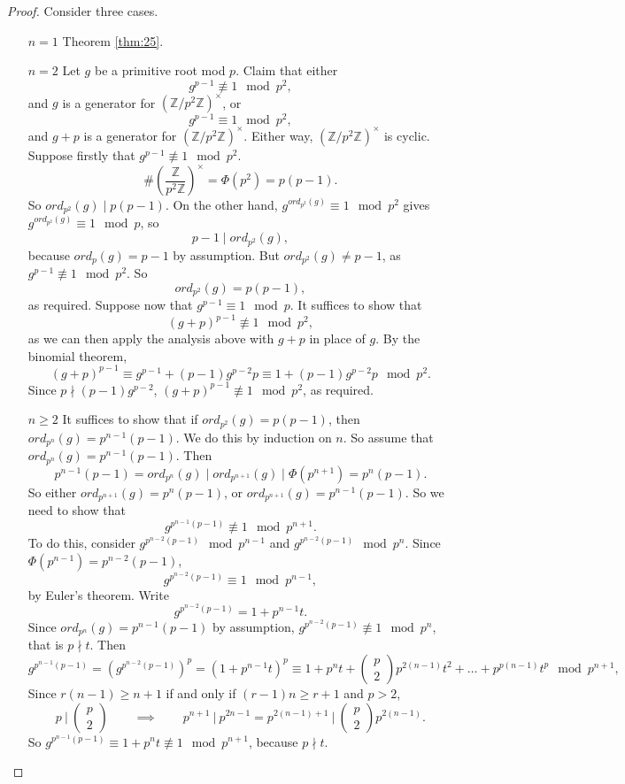 \documentclass{article}
\newcommand{\Z}{\mathbb{Z}}
\newcommand{\rb}[1]{\left( #1 \right)}
\newcommand{\two}[2]{\begin{pmatrix} #1 \\ #2 \end{pmatrix}}
\newcommand{\Unit}[1]{\rb{\dfrac{\Z}{#1\Z}}^\times}
\newcommand{\unit}[1]{\rb{\Z / #1\Z}^\times}
\theoremstyle{definition}\newtheorem{definition}{Definition}
\theoremstyle{definition}\newtheorem{remark}[definition]{Remark}
\theoremstyle{definition}\newtheorem*{example}{Example}
\theoremstyle{definition}\newtheorem*{note}{Note}
\begin{document}
\begin{proof}
Consider three cases.
\begin{itemize}[leftmargin=0.5in]
\item[$ n = 1 $] Theorem \ref{thm:25}.
\item[$ n = 2 $] Let $ g $ be a primitive root mod $ p $. Claim that either
$$ g^{p - 1} \not\equiv 1 \mod p^2, $$
and $ g $ is a generator for $ \unit{p^2} $, or
$$ g^{p - 1} \equiv 1 \mod p^2, $$
and $ g + p $ is a generator for $ \unit{p^2} $. Either way, $ \unit{p^2} $ is cyclic. Suppose firstly that $ g^{p - 1} \not\equiv 1 \mod p^2 $.
$$ \#\Unit{p^2} = \Phi\rb{p^2} = p\rb{p - 1}. $$
So $ ord_{p^2}\rb{g} \mid p\rb{p - 1} $. On the other hand, $ g^{ord_{p^2}\rb{g}} \equiv 1 \mod p^2 $ gives $ g^{ord_{p^2}\rb{g}} \equiv 1 \mod p $, so
$$ p - 1 \mid ord_{p^2}\rb{g}, $$
because $ ord_p\rb{g} = p - 1 $ by assumption. But $ ord_{p^2}\rb{g} \ne p - 1 $, as $ g^{p - 1} \not\equiv 1 \mod p^2 $. So
$$ ord_{p^2}\rb{g} = p\rb{p - 1}, $$
as required. Suppose now that $ g^{p - 1} \equiv 1 \mod p $. It suffices to show that
$$ \rb{g + p}^{p - 1} \not\equiv 1 \mod p^2, $$
as we can then apply the analysis above with $ g + p $ in place of $ g $. By the binomial theorem,
$$ \rb{g + p}^{p - 1} \equiv g^{p - 1} + \rb{p - 1}g^{p - 2}p \equiv 1 + \rb{p - 1}g^{p - 2}p \mod p^2. $$
Since $ p \nmid \rb{p - 1}g^{p - 2} $, $ \rb{g + p}^{p - 1} \not\equiv 1 \mod p^2 $, as required.
\item[$ n \ge 2 $] It suffices to show that if $ ord_{p^2}\rb{g} = p\rb{p - 1} $, then $ ord_{p^n}\rb{g} = p^{n - 1}\rb{p - 1} $. We do this by induction on $ n $. So assume that $ ord_{p^n}\rb{g} = p^{n - 1}\rb{p - 1} $. Then
$$ p^{n - 1}\rb{p - 1} = ord_{p^n}\rb{g} \mid ord_{p^{n + 1}}\rb{g} \mid \Phi\rb{p^{n + 1}} = p^n\rb{p - 1}. $$
So either $ ord_{p^{n + 1}}\rb{g} = p^n\rb{p - 1} $, or $ ord_{p^{n + 1}}\rb{g} = p^{n - 1}\rb{p - 1} $. So we need to show that
$$ g^{p^{n - 1}\rb{p - 1}} \not\equiv 1 \mod p^{n + 1}. $$
To do this, consider $ g^{p^{n - 2}\rb{p - 1}} \mod p^{n - 1} $ and $ g^{p^{n - 2}\rb{p - 1}} \mod p^n $. Since $ \Phi\rb{p^{n - 1}} = p^{n - 2}\rb{p - 1} $,
$$ g^{p^{n - 2}\rb{p - 1}} \equiv 1 \mod p^{n - 1}, $$
by Euler's theorem. Write
$$ g^{p^{n - 2}\rb{p - 1}} = 1 + p^{n - 1}t. $$
Since $ ord_{p^n}\rb{g} = p^{n - 1}\rb{p - 1} $ by assumption, $ g^{p^{n - 2}\rb{p - 1}} \not\equiv 1 \mod p^n $, that is $ p \nmid t $. Then
$$ g^{p^{n - 1}\rb{p - 1}} = \rb{g^{p^{n - 2}\rb{p - 1}}}^p = \rb{1 + p^{n - 1}t}^p \equiv 1 + p^nt + \two{p}{2}p^{2\rb{n - 1}}t^2 + \dots + p^{p\rb{n - 1}}t^p \mod p^{n + 1}, $$
Since $ r\rb{n - 1} \ge n + 1 $ if and only if $ \rb{r - 1}n \ge r + 1 $ and $ p > 2 $,
$$ p \ \Bigg| \ \two{p}{2} \qquad \implies \qquad p^{n + 1} \ \Bigg| \ p^{2n - 1} = p^{2\rb{n - 1} + 1} \ \Bigg| \ \two{p}{2}p^{2\rb{n - 1}}. $$
So $ g^{p^{n - 1}\rb{p - 1}} \equiv 1 + p^nt \not\equiv 1 \mod p^{n + 1} $, because $ p \nmid t $.
\end{itemize}
\end{proof}
\end{document}
